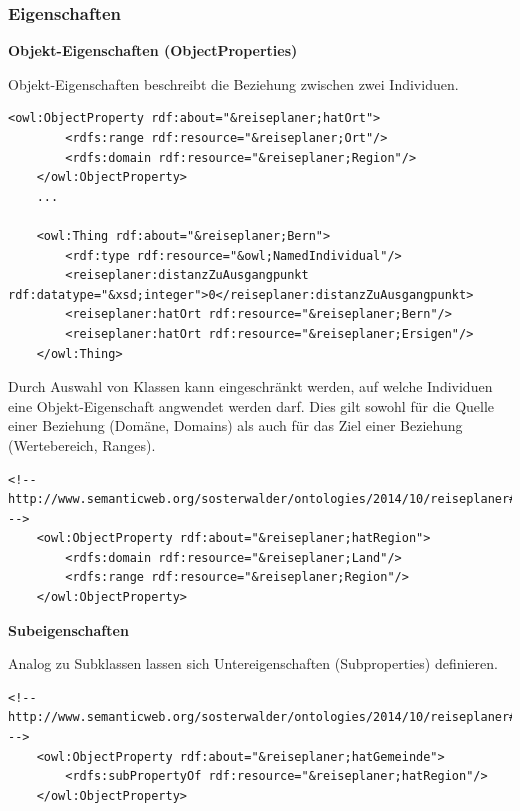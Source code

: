 \subsubsection{Eigenschaften}
\label{subsubsec:owlRdf_owl_wissenModellieren_wichtigsteElemente_Propertys}

\textbf{Objekt-Eigenschaften (ObjectProperties)}

Objekt-Eigenschaften beschreibt die Beziehung zwischen zwei Individuen.

\begin{lstlisting}[caption={Beispiel einer Objekteigenschaft \textit{hatOrt} und deren Anwendung}]
    <owl:ObjectProperty rdf:about="&reiseplaner;hatOrt">
        <rdfs:range rdf:resource="&reiseplaner;Ort"/>
        <rdfs:domain rdf:resource="&reiseplaner;Region"/>
    </owl:ObjectProperty>
    ...
    
    <owl:Thing rdf:about="&reiseplaner;Bern">
        <rdf:type rdf:resource="&owl;NamedIndividual"/>
        <reiseplaner:distanzZuAusgangpunkt rdf:datatype="&xsd;integer">0</reiseplaner:distanzZuAusgangpunkt>
        <reiseplaner:hatOrt rdf:resource="&reiseplaner;Bern"/>
        <reiseplaner:hatOrt rdf:resource="&reiseplaner;Ersigen"/>
    </owl:Thing>
\end{lstlisting}

Durch Auswahl von Klassen kann eingeschränkt werden, auf welche Individuen eine Objekt-Eigenschaft angwendet werden darf. Dies gilt sowohl für die Quelle einer Beziehung (Domäne, Domains) als auch für das Ziel einer Beziehung (Wertebereich, Ranges).


\begin{lstlisting}[caption={Beispiel von Einschränkungen der Objekteigenschaft \textit{hatRegion}}]
    <!-- http://www.semanticweb.org/sosterwalder/ontologies/2014/10/reiseplaner#hatRegion -->
    <owl:ObjectProperty rdf:about="&reiseplaner;hatRegion">
        <rdfs:domain rdf:resource="&reiseplaner;Land"/>
        <rdfs:range rdf:resource="&reiseplaner;Region"/>
    </owl:ObjectProperty>
\end{lstlisting}

\textbf{Subeigenschaften}

Analog zu Subklassen lassen sich Untereigenschaften (Subproperties) definieren.

\begin{lstlisting}[caption={Beispiel der Objekteigenschaft \textit{hatGemeinde} als Subeigenschaft von \textit{hatRegion}}]
    <!-- http://www.semanticweb.org/sosterwalder/ontologies/2014/10/reiseplaner#hatGemeinde -->
    <owl:ObjectProperty rdf:about="&reiseplaner;hatGemeinde">
        <rdfs:subPropertyOf rdf:resource="&reiseplaner;hatRegion"/>
    </owl:ObjectProperty>
\end{lstlisting}

